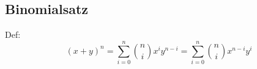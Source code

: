 \subsection{Binomialsatz}
Def:
\[
    (x + y)^n = \sum_{i = 0}^{n} {n \choose i} x^i y^{n - i} = \sum_{i = 0}^{n} {n \choose i} x^{n - i} y^i
\]

